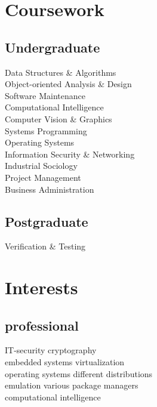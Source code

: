 \documentclass[]{resume}
\begin{document}
\vfill
\begin{minipage}[t]{0.33\textwidth} 
\section{Coursework}
	\subsection{Undergraduate}
		Data Structures \& Algorithms \\
		Object-oriented Analysis \& Design \\
		Software Maintenance \\
		Computational Intelligence\\
		Computer Vision \& Graphics \\
		Systems Programming \\
		Operating Systems \\
		Information Security \& Networking \\
		Industrial Sociology \\
		Project Management \\ 
		Business Administration
		\sectionsep
	
	\subsection{Postgraduate}
		Verification \& Testing
		\sectionsep	

\section{Interests} 
	\subsection{professional}
	IT-security \textbullet{} cryptography\\
	embedded systems \textbullet{} virtualization\\
	operating systems \textbullet{} different distributions\\
	emulation \textbullet{} various package managers\\
	computational intelligence
	\sectionsep


\end{minipage}
\end{document}

